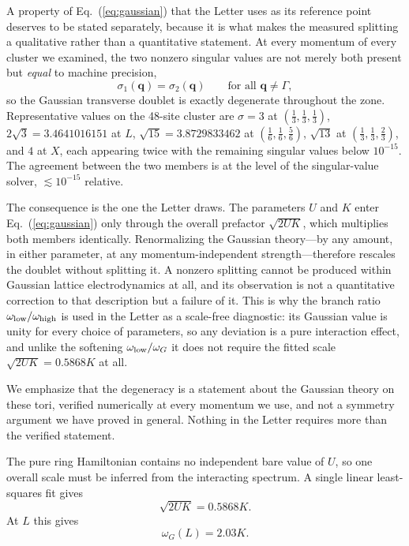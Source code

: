 \documentclass[
aps,
prl,
onecolumn,
amsmath,
amssymb,
superscriptaddress,
longbibliography
]{revtex4-2}
\newcommand{\bq}{\bm q}
\begin{document}
A property of Eq.~(\ref{eq:gaussian}) that the Letter uses as its
reference point deserves to be stated separately, because it is what
makes the measured splitting a qualitative rather than a quantitative
statement. At every momentum of every cluster we examined, the two
nonzero singular values are not merely both present but \emph{equal}
to machine precision,
\begin{equation}
\sigma_1(\bq)=\sigma_2(\bq)
\qquad\text{for all }\bq\neq\Gamma,
\end{equation}
so the Gaussian transverse doublet is exactly degenerate throughout
the zone. Representative values on the 48-site cluster are
$\sigma=3$ at $(\frac13,\frac13,\frac13)$, $2\sqrt3=3.4641016151$ at
$L$, $\sqrt{15}=3.8729833462$ at $(\frac16,\frac16,\frac56)$, $\sqrt{13}$ at $(\frac13,\frac13,\frac23)$, and $4$ at $X$,
each appearing twice with the remaining singular values below
$10^{-15}$. The agreement between the two members is at the level of
the singular-value solver, $\lesssim10^{-15}$ relative.

The consequence is the one the Letter draws. The parameters $U$ and
$K$ enter Eq.~(\ref{eq:gaussian}) only through the overall prefactor
$\sqrt{2UK}$, which multiplies both members identically. Renormalizing
the Gaussian theory---by any amount, in either parameter, at any
momentum-independent strength---therefore rescales the doublet without
splitting it. A nonzero splitting cannot be produced within Gaussian
lattice electrodynamics at all, and its observation is not a
quantitative correction to that description but a failure of it. This
is why the branch ratio $\omega_{\rm low}/\omega_{\rm high}$ is used
in the Letter as a scale-free diagnostic: its Gaussian value is unity
for every choice of parameters, so any deviation is a pure
interaction effect, and unlike the softening
$\omega_{\rm low}/\omega_G$ it does not require the fitted scale
$\sqrt{2UK}=0.5868K$ at all.

We emphasize that the degeneracy is a statement about the Gaussian
theory on these tori, verified numerically at every momentum we use,
and not a symmetry argument we have proved in general. Nothing in the
Letter requires more than the verified statement.

The pure ring Hamiltonian contains no independent bare value of $U$,
so one overall scale must be inferred from the interacting spectrum.
A single linear least-squares fit gives
\begin{equation}
\sqrt{2UK}=0.5868K.
\end{equation}
At $L$ this gives
\begin{equation}
\omega_G(L)=2.03K.
\end{equation}
\end{document}
